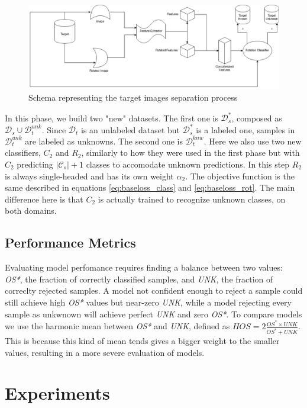 \documentclass[10pt,twocolumn,letterpaper]{article}
\begin{document}
\begin{figure}
  \includegraphics[width=\textwidth ]{scheme.png}
  \caption{\label{fig:separation} Schema representing the target images separation process}
\end{figure}

In this phase,
we build two "new" datasets.
The first one is $\mathcal{D}_s^*$, composed as $\mathcal{D}_s \cup \mathcal{D}_t^{unk}$.
Since $\mathcal{D}_t$ is an unlabeled dataset but $\mathcal{D}_s^*$ is a labeled one,
samples in $\mathcal{D}_t^{unk}$ are labeled as unknowns.
The second one is $\mathcal{D}_t^{knw}$.
Here we also use two new classifiers,
$C_2$ and $R_2$,
similarly to how they were used in the first phase but with $C_2$ predicting $|\mathcal{C}_s|+1$ classes to accomodate unknown predictions.
In this step $R_2$ is always single-headed and has its own weight $\alpha_2$.
The objective function is the same described in equations \ref{eq:baseloss_class} and \ref{eq:baseloss_rot}.
The main difference here is that $C_2$ is actually trained to recognize unknown classes,
on both domains.

\subsection{Performance Metrics}
\label{sec:performance_metrics}

Evaluating model perfomance requires finding a balance between two values:
{\it OS*}, 
the fraction of correctly classified samples,
and {\it UNK}, 
the fraction of correclty rejected samples.
A model not confident enough to reject a sample could still achieve high {\it OS*} values but near-zero {\it UNK},
while a model rejecting every  sample as unkwnown will achieve perfect {\it UNK} and zero {\it OS*}.
To compare models we use the harmonic mean between {\it OS*} and {\it UNK}, 
defined as $HOS = 2\frac{OS^*\times UNK}{OS^*+UNK}$.
This is because this kind of mean tends gives a bigger weight to the smaller values,
resulting in a more severe evaluation of models.

\section{Experiments}
\label{sec:experiments}
\end{document}
